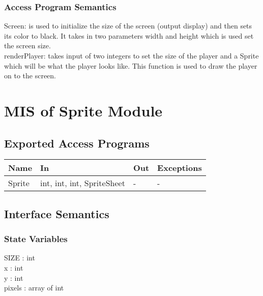 \documentclass[12pt, letterpaper]{article}
\begin{document}
	\subsubsection{Access Program Semantics}
	
	Screen: is used to initialize the size of the screen (output display) and then \indent sets its color to black. It takes in two parameters width and height which \indent is used set the screen size.\\
	
	\noindent renderPlayer: takes input of two integers to set the size of the player and a \indent Sprite which will be what the player looks like. This function is used to \indent draw the player on to the screen.\\
	
	
	\section{MIS of Sprite Module}
	
	\subsection{Exported Access Programs}
	
			\begin{center}
				\begin{tabular}{ p{4cm} p{3cm} p{3cm} p{4cm} }
					\hline
					\textbf{Name} & \textbf{In} & \textbf{Out} & \textbf{Exceptions}\\ 
					\hline
					Sprite & int, int, int, SpriteSheet & - & -  \\ 
					\hline
					
				\end{tabular}				
			\end{center}
	
	\subsection{Interface Semantics}
	
	\subsubsection{State Variables}
	
	SIZE : int \\
	x : int \\
	y : int \\
	pixels : array of int \\
	
\end{document}
